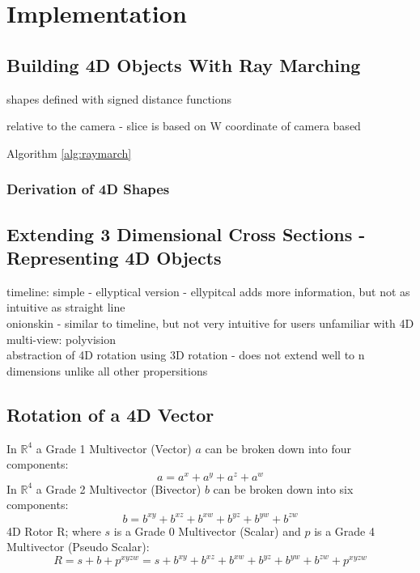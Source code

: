 \documentclass{l4proj}
\begin{document}
\chapter{Implementation}

\section{Building 4D Objects With Ray Marching}

shapes defined with signed distance functions

relative to the camera - slice is based on W coordinate of camera based

\citep{the_art_of_code_writing_2019} %

Algorithm \ref{alg:raymarch}

\subsection{Derivation of 4D Shapes}

\citep{quilez_distance_nodate}
\citep{the_art_of_code_ray_2019} %

\section{Extending 3 Dimensional Cross Sections - Representing 4D Objects}

timeline: simple - ellyptical version
 - ellypitcal adds more information, but not as intuitive as straight line\\
onionskin - similar to timeline, but not very intuitive for users unfamiliar with 4D\\
multi-view: polyvision\\
abstraction of 4D rotation using 3D rotation - does not extend well to n dimensions unlike all other propersitions

\section{Rotation of a 4D Vector}

In $\mathbb{R}^4$ a Grade 1 Multivector (Vector) \(a\) can be broken down into four components:
\begin{equation}
  a = a^x + a^y + a^z + a^w
\end{equation}
In $\mathbb{R}^4$ a Grade 2 Multivector (Bivector) \(b\) can be broken down into six components:
\begin{equation}
  b = b^{xy} + b^{xz} + b^{xw} + b^{yz} + b^{yw} + b^{zw}
\end{equation}
4D Rotor R; where \(s\) is a Grade 0 Multivector (Scalar) and \(p\) is a Grade 4 Multivector (Pseudo Scalar):
\begin{equation}
  R = s + b + p^{xyzw} = 
  s + b^{xy} + b^{xz} + b^{xw} + b^{yz} + b^{yw} + b^{zw} + p^{xyzw}
\end{equation}
\end{document}
